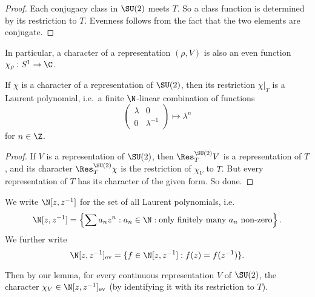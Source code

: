 \documentclass[a4paper]{article}
\begin{document}
\begin{proof}
  Each conjugacy class in $\SU(2)$ meets $T$. So a class function is determined by its restriction to $T$. Evenness follows from the fact that the two elements are conjugate.
\end{proof}

In particular, a character of a representation $(\rho, V)$ is also an even function $\chi_\rho: S^1 \to \C$.

\begin{lemma}
  If $\chi$ is a character of a representation of $\SU(2)$, then its restriction $\chi|_T$ is a Laurent polynomial, i.e.\ a finite $\N$-linear combination of functions
  \[
    \begin{pmatrix}
      \lambda & 0\\
      0 & \lambda^{-1}
    \end{pmatrix} \mapsto \lambda^n
  \]
  for $n \in \Z$.
\end{lemma}

\begin{proof}
  If $V$ is a representation of $\SU(2)$, then $\Res_T^{\SU(2)} V$ is a representation of $T$, and its character $\Res_T^{\SU(2)} \chi$ is the restriction of $\chi_V$ to $T$. But every representation of $T$ has its character of the given form. So done.
\end{proof}

\begin{notation}
  We write $\N[z, z^{-1}]$ for the set of all Laurent polynomials, i.e.
  \[
    \N[z, z^{-1}] = \left\{\sum a_n z^n: a_n \in \N: \text{only finitely many $a_n$ non-zero}\right\}.
  \]
  We further write
  \[
    \N[z, z^{-1}]_{\mathrm{ev}} = \{f \in \N[z, z^{-1}]: f(z) = f(z^{-1})\}.
  \]
\end{notation}
Then by our lemma, for every continuous representation $V$ of $\SU(2)$, the character $\chi_V \in \N[z, z^{-1}]_{\mathrm{ev}}$ (by identifying it with its restriction to $T$).
\end{document}
